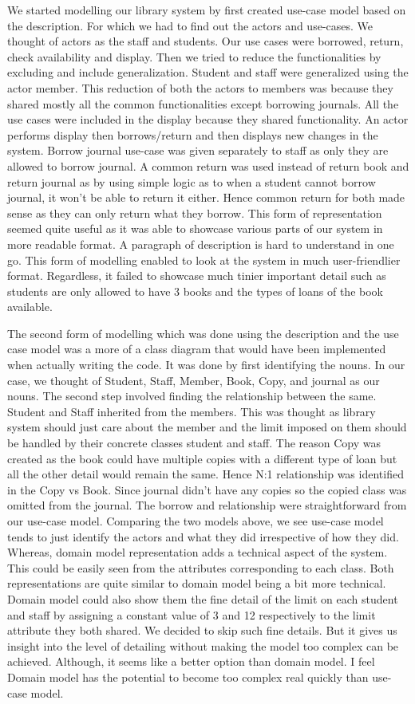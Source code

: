 We started modelling our library system by first created use-case model based on the description. For which we had to find out the actors and use-cases. We thought of actors as the staff and students. Our use cases were borrowed, return, check availability and display. Then we tried to reduce the functionalities by excluding and include generalization. Student and staff were generalized using the actor member. This reduction of both the actors to members was because they shared mostly all the common functionalities except borrowing journals. All the use cases were included in the display because they shared functionality. An actor performs display then borrows/return and then displays new changes in the system. Borrow journal use-case was given separately to staff as only they are allowed to borrow journal. A common return was used instead of return book and return journal as by using simple logic as to when a student cannot borrow journal, it won't be able to return it either. Hence common return for both made sense as they can only return what they borrow. This form of representation seemed quite useful as it was able to showcase various parts of our system in more readable format. A paragraph of description is hard to understand in one go. This form of modelling enabled to look at the system in much user-friendlier format. Regardless, it failed to showcase much tinier important detail such as students are only allowed to have 3 books and the types of loans of the book available.

The second form of modelling which was done using the description and the use case model was a more of a class diagram that would have been implemented when actually writing the code. It was done by first identifying the nouns. In our case, we thought of Student, Staff, Member, Book, Copy, and journal as our nouns. The second step involved finding the relationship between the same. Student and Staff inherited from the members. This was thought as library system should just care about the member and the limit imposed on them should be handled by their concrete classes student and staff. The reason Copy was created as the book could have multiple copies with a different type of loan but all the other detail would remain the same. Hence N:1 relationship was identified in the Copy vs Book. Since journal didn't have any copies so the copied class was omitted from the journal. The borrow and relationship were straightforward from our use-case model. Comparing the two models above, we see use-case model tends to just identify the actors and what they did irrespective of how they did. Whereas, domain model representation adds a technical aspect of the system. This could be easily seen from the attributes corresponding to each class. Both representations are quite similar to domain model being a bit more technical. Domain model could also show them the fine detail of the limit on each student and staff by assigning a constant value of 3 and 12 respectively to the limit attribute they both shared. We decided to skip such fine details. But it gives us insight into the level of detailing without making the model too complex can be achieved. Although, it seems like a better option than domain model. I feel Domain model has the potential to become too complex real quickly than use-case model. 

